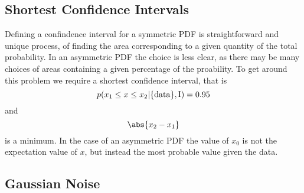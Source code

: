 \documentclass{dwnotes}         		        %
\begin{document}
\subsection{Shortest Confidence Intervals}
\label{sec:short-conf-interv}

Defining a confindence interval for a symmetric PDF is straightforward
and unique process, of finding the area corresponding to a given
quantity of the total probability. In an asymmetric PDF the choice is
less clear, as there may be many choices of areas containing a given
percentage of the proability. To get around this problem we require a
shortest confidence interval, that is
\[ p(x_1 \le x \le x_2 | \{ \rm data \}, I) = 0.95 \]
and 
\[ \abs{x_2 - x_1} \] is a minimum. In the case of an asymmetric PDF
the value of $x_0$ is not the expectation value of $x$, but instead
the most probable value given the data.

\subsection{Gaussian Noise}
\label{sec:gaussian-noise}
\end{document}
